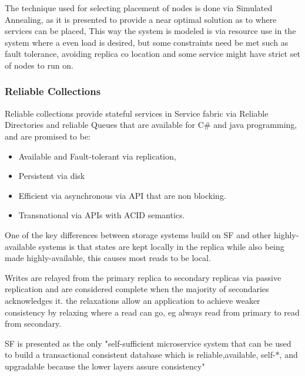 \documentclass[a4paper,10pt,titlepage]{report}
\begin{document}
    The technique used for selecting placement of nodes is done via Simulated Annealing, as it is presented to provide a near optimal solution as to where services can be placed, This way the system is modeled is via resource use in the system where a even load is desired, but some constraints need be met such as fault tolerance, avoiding replica co location and some service might have strict set of nodes to run on. \\
    \vspace{5mm}

    \subsubsection{Reliable Collections}

    Reliable collections provide stateful services in Service fabric via Reliable Directories and reliable Queues that are available for C\# and java programming, and are promised to be:
    \begin{itemize}
        \item Available and Fault-tolerant via replication,
        \item Persistent via disk
        \item Efficient via asynchronous via API that are non blocking.
        \item Transnational via APIs with ACID semantics.
    \end{itemize}

    One of the key differences between storage systems build on SF and other highly-available systems is that states are kept locally in the replica while also being made highly-available, this causes most reads to be local.\\
    \vspace{5mm}

    Writes are relayed from the primary replica to secondary replicas via passive replication and are considered complete when the majority of secondaries acknowledges it. the relaxations allow an application to achieve weaker consistency by relaxing where a read can go, eg always read from primary to read from secondary. \\
    \vspace{5mm}

    SF is presented as the only "self-sufficient microservice system that can be used to build a transactional consistent database which is reliable,available, self-*, and upgradable because the lower layers assure consistency"\cite{SFpaper} \\
    \vspace{5mm}
\end{document}
